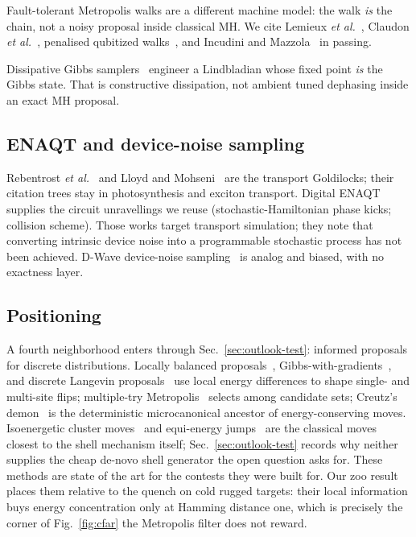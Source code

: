 \documentclass[aps,prx,reprint,floatfix,amsmath,amssymb,amsfonts]{revtex4-2}
\begin{document}
Fault-tolerant Metropolis walks are a different machine model: the walk
\emph{is} the chain, not a noisy proposal inside classical MH. We cite
Lemieux \emph{et al.}~\cite{Lemieux2020}, Claudon
\emph{et al.}~\cite{Claudon2025}, penalised qubitized
walks~\cite{CarrascoArango2026}, and Incudini and
Mazzola~\cite{IncudiniMazzola2026} in passing.

Dissipative Gibbs samplers~\cite{Zhang2023,Chen2023} engineer a
Lindbladian whose fixed point \emph{is} the Gibbs state. That is
constructive dissipation, not ambient tuned dephasing inside an exact
MH proposal.

\subsection{ENAQT and device-noise sampling}

Rebentrost \emph{et al.}~\cite{Rebentrost2009} and Lloyd and
Mohseni~\cite{LloydMohseni2011} are the transport Goldilocks; their
citation trees stay in photosynthesis and exciton transport. Digital
ENAQT~\cite{Gallina2022,Gallina2024} supplies the circuit unravellings
we reuse (stochastic-Hamiltonian phase kicks; collision scheme). Those
works target transport simulation; they note that converting intrinsic
device noise into a programmable stochastic process has not been
achieved. D-Wave device-noise sampling~\cite{Nelson2022} is analog and
biased, with no exactness layer.

\subsection{Positioning}

A fourth neighborhood enters through
Sec.~\ref{sec:outlook-test}: informed proposals for discrete
distributions. Locally balanced proposals~\cite{Zanella2020},
Gibbs-with-gradients~\cite{Grathwohl2021}, and discrete Langevin
proposals~\cite{Zhang2022DLP} use local energy differences to shape
single- and multi-site flips; multiple-try Metropolis~\cite{Liu2000MTM}
selects among candidate sets; Creutz's demon~\cite{Creutz1983} is the
deterministic microcanonical ancestor of energy-conserving moves.
Isoenergetic cluster moves~\cite{Houdayer2001,Zhu2015ICM} and
equi-energy jumps~\cite{Kou2006EE} are the classical moves closest to
the shell mechanism itself; Sec.~\ref{sec:outlook-test} records why
neither supplies the cheap de-novo shell generator the open question
asks for. These
methods are state of the art for the contests they were built for. Our
zoo result places them relative to the quench on cold rugged targets:
their local information buys energy concentration only at Hamming
distance one, which is precisely the corner of
Fig.~\ref{fig:cfar} the Metropolis filter does not reward.
\end{document}
